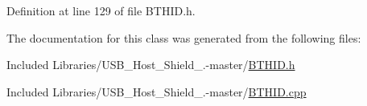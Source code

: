 \-Definition at line 129 of file \-B\-T\-H\-I\-D.\-h.



\-The documentation for this class was generated from the following files\-:\begin{DoxyCompactItemize}
\item 
\-Included Libraries/\-U\-S\-B\-\_\-\-Host\-\_\-\-Shield\-\_.-\/master/\hyperlink{_b_t_h_i_d_8h}{\-B\-T\-H\-I\-D.\-h}\item 
\-Included Libraries/\-U\-S\-B\-\_\-\-Host\-\_\-\-Shield\-\_.-\/master/\hyperlink{_b_t_h_i_d_8cpp}{\-B\-T\-H\-I\-D.\-cpp}\end{DoxyCompactItemize}
